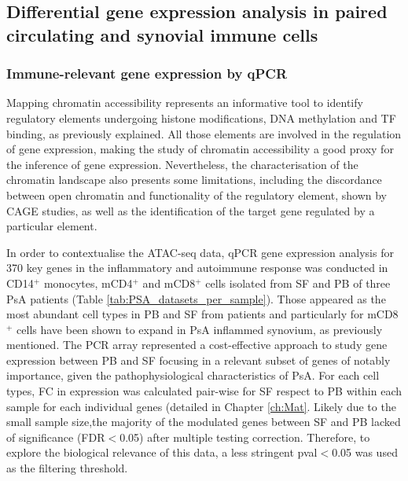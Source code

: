 


\subsection{Differential gene expression analysis in paired circulating and synovial immune cells}

\subsubsection{Immune-relevant gene expression by qPCR}
Mapping chromatin accessibility represents an informative tool to identify regulatory elements undergoing histone modifications, DNA methylation and TF binding, as previously explained. All those elements are involved in the regulation of gene expression, making the study of chromatin accessibility a good proxy for the inference of gene expression. Nevertheless, the characterisation of the chromatin landscape also presents some limitations, including the discordance between open chromatin and functionality of the regulatory element, shown by CAGE studies, as well as the identification of the target gene regulated by a particular element. 

In order to contextualise the ATAC-seq data, qPCR gene expression analysis for 370 key genes in the inflammatory and autoimmune response was conducted in CD14$^+$ monocytes, mCD4$^+$ and mCD8$^+$ cells isolated from SF and PB of three PsA patients (Table \ref{tab:PSA_datasets_per_sample}). Those appeared as the most abundant cell types in PB and SF from patients and particularly for mCD8$^+$ cells have been shown to expand in PsA inflammed synovium, as previously mentioned. The PCR array represented a cost-effective approach to study gene expression between PB and SF focusing in a relevant subset of genes of notably importance, given the pathophysiological characteristics of PsA. For each cell types, FC in expression was calculated pair-wise for SF respect to PB within each sample for each individual genes (detailed in Chapter \ref{ch:Mat}. Likely due to the small sample size,the majority of the modulated genes between SF and PB lacked of significance (FDR$<$0.05) after multiple testing correction. Therefore, to explore the biological relevance of this data, a less stringent pval$<$0.05 was used as the filtering threshold. 

